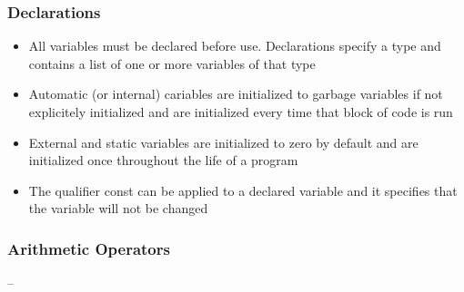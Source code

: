 \subsubsection{Declarations}
\begin{itemize}{--}
	\item All variables must be declared before use. Declarations specify a type and contains a list of one or more variables of that type
	\item Automatic (or internal) cariables are initialized to garbage variables if not explicitely initialized and are initialized every time that block of code is run
	\item External and static variables are initialized to zero by default and are initialized once throughout the life of a program
	\item The qualifier const can be applied to a declared variable and it specifies that the variable will not be changed 
\end{itemize}

\subsubsection{Arithmetic Operators}
\begin{itemize}{--}

\end{itemize}
